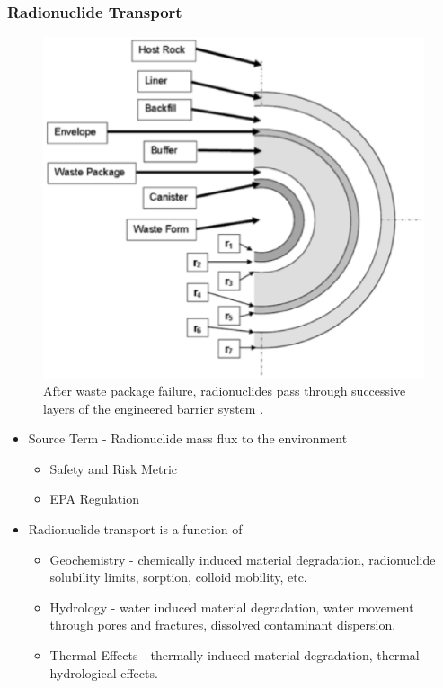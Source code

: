 

\begin{frame}[ctb!]
  \frametitle{Radionuclide Transport}
  \begin{minipage}{0.49\textwidth}
  \begin{figure}[h!]
      \includegraphics[width=\textwidth]{ebsLayersLLNL.eps}
    \caption{After waste package failure, radionuclides pass through successive 
    layers of the engineered barrier system \cite{greenberg_thermal_2011}.}
    \label{fig:ebsLayersLLNL}
  \end{figure}
  \end{minipage}
  \hspace{0.01cm}
  \begin{minipage}{0.49\textwidth}
    \begin{itemize}
      \item Source Term - Radionuclide mass flux to the environment
        \begin{itemize}
          \item Safety and Risk Metric
          \item EPA Regulation
        \end{itemize}
      \item Radionuclide transport is a function of
        \begin{itemize}
          \item Geochemistry - chemically induced material degradation, 
            radionuclide solubility limits, sorption, colloid mobility, etc.
          \item Hydrology - water induced material degradation, 
            water movement through pores and fractures, 
            dissolved contaminant dispersion. 
          \item Thermal Effects - thermally induced material degradation, 
            thermal hydrological effects.
        \end{itemize}
    \end{itemize}
  \end{minipage}
\end{frame}



